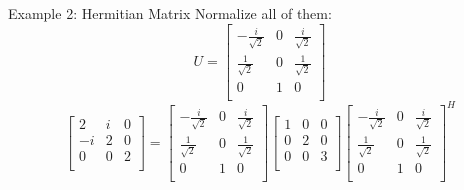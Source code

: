 \documentclass{beamer}
\begin{document}
\begin{frame}{Example 2: Hermitian Matrix}
Normalize all of them:
\begin{equation*}
    U=\left[ \begin{matrix}
        -\frac{i}{\sqrt{2}}&		0&		\frac{i}{\sqrt{2}}\\
        \frac{1}{\sqrt{2}}&		0&		\frac{1}{\sqrt{2}}\\
        0&		1&		0\\
    \end{matrix} \right]
\end{equation*}
\begin{equation*}
    \left[ \begin{matrix}
        2&		i&		0\\
        -i&		2&		0\\
        0&		0&		2\\
    \end{matrix} \right] =\left[ \begin{matrix}
        -\frac{i}{\sqrt{2}}&		0&		\frac{i}{\sqrt{2}}\\
        \frac{1}{\sqrt{2}}&		0&		\frac{1}{\sqrt{2}}\\
        0&		1&		0\\
    \end{matrix} \right] \left[ \begin{matrix}
        1&		0&		0\\
        0&		2&		0\\
        0&		0&		3\\
    \end{matrix} \right] \left[ \begin{matrix}
        -\frac{i}{\sqrt{2}}&		0&		\frac{i}{\sqrt{2}}\\
        \frac{1}{\sqrt{2}}&		0&		\frac{1}{\sqrt{2}}\\
        0&		1&		0\\
    \end{matrix} \right] ^H
\end{equation*}


\end{frame}
\end{document}
